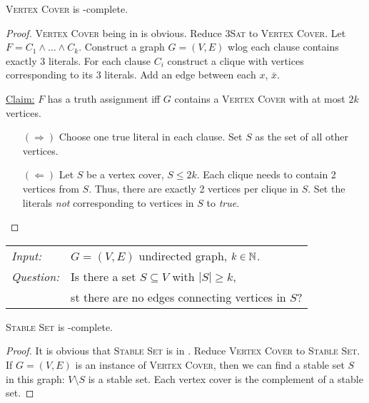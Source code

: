 \documentclass[../skript.tex]{subfiles}
\begin{document}
\begin{theorem} %
\label{thm:8}
\textsc{Vertex Cover} is \NP-complete.
\end{theorem}
\begin{proof}
\textsc{Vertex Cover} being in \NP{} is obvious.
Reduce \textsc{3Sat} to \textsc{Vertex Cover}.
Let $F = C_1 \wedge \ldots \wedge C_k$. Construct a graph $G = (V, E)$
\Ac{wlog} each clause contains exactly 3 literals.
For each clause $C_i$ construct a clique with vertices corresponding to its 3 literals.
Add an edge between each $x$, $\bar{x}$.

\underline{Claim:} $F$ has a truth assignment \ac{iff} $G$ contains a \textsc{Vertex Cover} with at most $2k$ vertices.
\begin{itemize}
\item[$(\Rightarrow)$] Choose one true literal in each clause. Set $S$ as the set of all other vertices.
\item[$(\Leftarrow)$] Let $S$ be a vertex cover, $S \leq 2k$. Each clique needs to contain 2 vertices from $S$. Thus, there are exactly 2 vertices per clique in $S$.
Set the literals \emph{not} corresponding to vertices in $S$ to \textit{true}.
\end{itemize}
\end{proof}
\begin{problem}
\begin{tabular}{@{}ll}
\textit{Input:} & $G = (V, E)$ undirected graph, $k \in \mathbb{N}$. \\
\textit{Question:} & Is there a set $S \subseteq V$ with $|S| \geq k$, \\
& \ac{st} there are no edges connecting vertices in $S$?
\end{tabular}
\end{problem}
\begin{theorem} %
\label{thm:9}
\textsc{Stable Set} is \NP-complete.
\end{theorem}
\begin{proof}
It is obvious that \textsc{Stable Set} is in \NP.
Reduce \textsc{Vertex Cover} to \textsc{Stable Set}.
If $G = (V, E)$ is an instance of \textsc{Vertex Cover}, then we can find a stable set $S$ in this graph: $V \setminus S$ is a stable set.
Each vertex cover is the complement of a stable set.
\end{proof}
\end{document}
